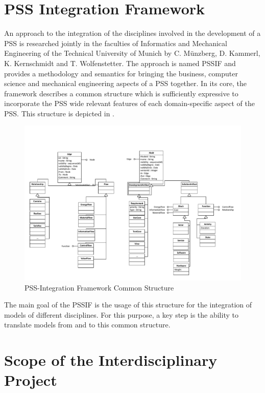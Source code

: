 \section*{PSS Integration Framework}

An approach to the integration of the disciplines involved in the development of a \gls{PSS} is researched jointly in the faculties of Informatics and Mechanical Engineering of the Technical University of Munich by C. M\"unzberg, D. Kammerl, K. Kernschmidt and T. Wolfenstetter. The approach is named \gls{PSSIF} and provides a methodology and semantics for bringing the business, computer science and mechanical engineering aspects of a \gls{PSS} together. In its core, the framework describes a common structure which is sufficiently expressive to incorporate the \gls{PSS} wide relevant features of each domain-specific aspect of the PSS. This structure is depicted in .

\begin{figure}
\centering
\includegraphics[width=\textwidth]{figures/PSSIF.pdf}
\caption{PSS-Integration Framework Common Structure}
\label{fig:canonic}
\end{figure}

The main goal of the \gls{PSSIF} is the usage of this structure for the integration of models of different disciplines. For this purpose, a key step is the ability to translate models from and to this common structure.

\section*{Scope of the Interdisciplinary Project}

